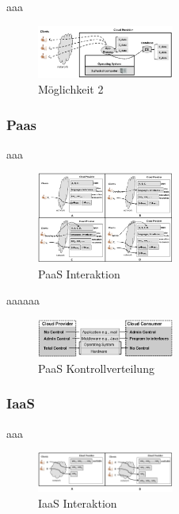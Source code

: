 aaa

\begin{figure}[H]
    \centering
	\includegraphics[width=0.4\textwidth]{Images/SaaSM2}
	\caption{Möglichkeit 2 \cite{Badger}}
	\label{SaaSM2}
\end{figure}

\subsubsection{Paas}
aaa

\begin{figure}[H]
    \centering
	\includegraphics[width=0.4\textwidth]{Images/PaaSInteraction}
	\caption{PaaS Interaktion \cite{Badger}}
	\label{PaaSInteration}
\end{figure}

aaaaaa
\begin{figure}[H]
    \centering
	\includegraphics[width=0.4\textwidth]{Images/PaaSControl}
	\caption{PaaS Kontrollverteilung \cite{Badger}}
	\label{PaaSControl}
\end{figure}

\subsubsection{IaaS}
aaa
\begin{figure}[H]
    \centering
	\includegraphics[width=0.4\textwidth]{Images/IaaSInteraction}
	\caption{IaaS Interaktion \cite{Badger}}
	\label{IaaSInteraction}
\end{figure}

